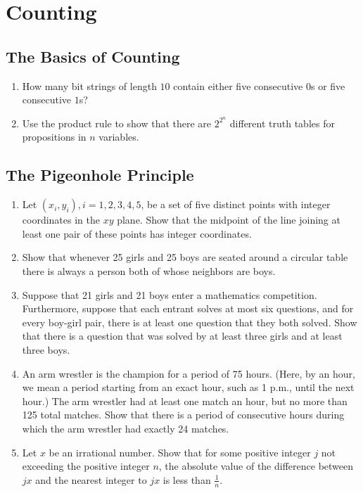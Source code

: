 \documentclass{sig-alternate-05-2015}
\begin{document}
\section{Counting}
\subsection{The Basics of Counting}
\begin{enumerate}
	\item How many bit strings of length $10$ contain either five consecutive
	$0$s or five consecutive $1$s?
	
	\item Use the product rule to show that there are $2^{2^n}$
	different truth tables for propositions in $n$ variables.

\end{enumerate}
\subsection{The Pigeonhole Principle}
\begin{enumerate}
	\item Let $(x_i, y_i), i = 1, 2, 3, 4, 5$, be a set of five distinct points with integer coordinates in the $xy$ plane. Show that the
	midpoint of the line joining at least one pair of these points has integer coordinates.
	
	\item Show that whenever 25 girls and 25 boys are seated around a circular table there is always a person both of whose neighbors are boys.
	
	\item Suppose that 21 girls and 21 boys enter a mathematics competition. Furthermore, suppose that each entrant solves at most six questions, and for every boy-girl pair, there is at least one question that they both solved. Show that there is a question that was solved by at least three girls and at least three boys.
	
	\item An arm wrestler is the champion for a period of 75 hours. (Here, by an hour, we mean a period starting from an exact hour, such as 1 p.m., until the next hour.) The arm wrestler had at least one match an hour, but no more than 125 total matches. Show that there is a period of consecutive hours during which the arm wrestler had exactly 24 matches.
	
	\item Let $x$ be an irrational number. Show that for some positive integer $j$ not exceeding the positive integer $n$, the absolute value of the difference between $jx$ and the nearest integer to $jx$ is less than $\frac{1}{n}$.
\end{enumerate}
\end{document}
